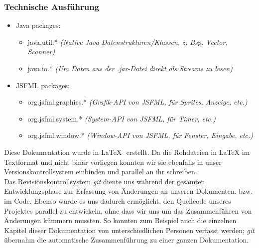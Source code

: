 \documentclass[12pt,a4paper]{scrartcl}
\begin{document}
\subsubsection{Technische Ausführung}
\begin{itemize}
\item Java packages: \begin{itemize}
	\item java.util.* \textit{(Native Java Datenstrukturen/Klassen, z. Bsp. Vector, Scanner)}
	\item java.io.* \textit{(Um Daten aus der .jar-Datei direkt als Streams zu lesen)}
\end{itemize}
\item JSFML packages: \begin{itemize}
	\item org.jsfml.graphics.* \textit{(Grafik-API von JSFML, für Sprites, Anzeige, etc.)}
	\item org.jsfml.system.* \textit{(System-API von JSFML, für Timer, etc.)}
	\item org.jsfml.window.* \textit{(Window-API von JSFML, für Fenster, Eingabe, etc.)}
\end{itemize}
\end{itemize}

Diese Dokumentation wurde in \LaTeX \,\, erstellt. Da die Rohdateien in LaTeX im Textformat und nicht
binär vorliegen konnten wir sie ebenfalls in unser Versionskontrollsystem einbinden und parallel
an ihr schreiben.\\

Das Revisionskontrollsystem \textit{git} diente uns während der gesamten Entwicklungsphase
zur Erfassung von Änderungen an unseren Dokumenten, bzw. im Code. Ebenso wurde es uns dadurch
ermöglicht, den Quellcode unseres Projektes parallel zu entwickeln, ohne dass wir uns
um das Zusammenführen von Änderungen kümmern mussten. So konnten zum Beispiel auch
die einzelnen Kapitel dieser Dokumentation von unterschiedlichen Personen verfasst werden;
\textit{git} übernahm die automatische Zusammenführung zu einer ganzen Dokumentation.\\
\end{document}
